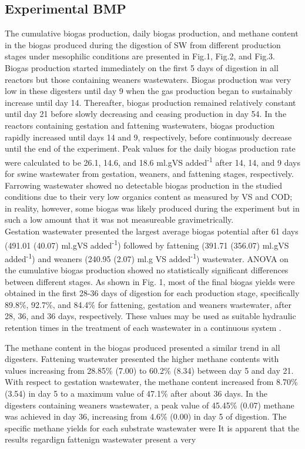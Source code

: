 \subsection{Experimental BMP}
The cumulative biogas production, daily biogas production, and methane content in the biogas produced during the digestion of SW from different production stages under mesophilic conditions are presented in Fig.1, Fig.2, and Fig.3.\\

Biogas production started immediately on the first 5 days of digestion in all reactors but those containing weaners wastewaters. Biogas production was very low in these digesters until day 9 when the gas production began to sustainably increase until day 14. Thereafter, biogas production remained relatively constant until day 21 before slowly decreasing and ceasing production in day 54. In the reactors containing gestation and fattening wastewaters, biogas production rapidly increased until days 14 and 9, respectively, before continuously decrease until the end of the experiment. Peak values for the daily biogas production rate were calculated to be 26.1, 14.6, and 18.6 ml.gVS added\textsuperscript{-1} after 14, 14, and 9 days for swine wastewater from gestation, weaners, and fattening stages, respectively.
Farrowing wastewater showed no detectable biogas production in the studied conditions due to their very low organics content as measured by VS and COD; in reality, however, some biogas was likely produced during the experiment but in such a low amount that it was not measureable gravimetrically.\\
Gestation wastewater presented the largest average biogas potential after 61 days (491.01 (40.07) ml.gVS added\textsuperscript{-1}) followed by fattening (391.71 (356.07) ml.gVS added\textsuperscript{-1}) and weaners (240.95 (2.07) ml.g VS added\textsuperscript{-1}) wastewater. ANOVA on the cumulative biogas production showed no statistically significant differences between different stages. As shown in Fig. 1, most of the final biogas yields were obtained in the first 28-36 days of digestion for each production stage, specifically 89.8\%, 92.7\%, and 84.4\% for fattening, gestation and weaners wastewater, after 28, 36, and 36 days, respectively. These values may be used as suitable hydraulic retention times in the treatment of each wastewater in a continuous system \cite{Li_2013}.

The methane content in the biogas produced presented a similar trend in all digesters. Fattening wastewater presented the higher methane contents with values increasing from 28.85\% (7.00) to 60.2\% (8.34) between day 5 and day 21. With respect to gestation wastewater, the methane content increased from 8.70\% (3.54) in day 5 to a maximum value of 47.1\% after about 36 days. In the digesters containing weaners wastewater, a peak value of 45.45\% (0.07) methane was achieved in day 36, increasing from 4.6\% (0.00) in day 5 of digestion. The specific methane yields for each substrate wastewater were It is apparent that the results regardign fattenign wastewater present a very